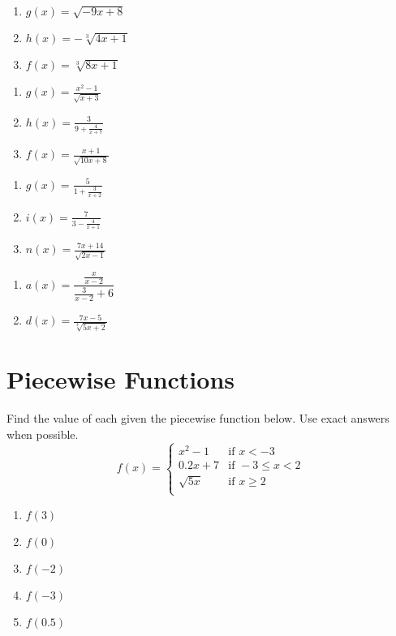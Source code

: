 \begin{multicols}{3}
\begin{enumerate}	\setcounter{enumi}{\value{Review}}
	\item $g(x) = \sqrt{-9x+8}$
	\item $h(x) = -\sqrt[3]{4x+1}$
	\item $f(x) = \sqrt[3]{8x+1}$
\end{enumerate}	\setcounter{Review}{\value{enumi}}
\end{multicols}
\begin{multicols}{3}
\begin{enumerate}	\setcounter{enumi}{\value{Review}}
	\item $g(x) = \frac{x^2-1}{\sqrt{x+3}}$
	\item $h(x) = \frac{3}{9 + \frac{4}{x+7}}$
	\item $f(x) = \frac{x+1}{\sqrt{10x+8}}$
\end{enumerate}	\setcounter{Review}{\value{enumi}}
\end{multicols}
\begin{multicols}{3}
\begin{enumerate}	\setcounter{enumi}{\value{Review}}
	\item $g(x) = \frac{5}{1+\frac{3}{x+2}}$
	\item $i(x) = \frac{7}{3-\frac{4}{x+1}}$
	\item $n(x) = \frac{7x+14}{\sqrt{2x-1}}$
\end{enumerate}	\setcounter{Review}{\value{enumi}}
\end{multicols}
\begin{multicols}{3}
\begin{enumerate}	\setcounter{enumi}{\value{Review}}
	\item $a(x) = \dfrac{\frac{x}{x-2}}{{\frac{3}{x-2}+6}}$
	\item $d(x) = \frac{7x-5}{\sqrt[3]{5x+2}}$
\end{enumerate}
\end{multicols}

\section{Piecewise Functions}

Find the value of each given the piecewise function below. Use exact answers when possible.
\[
f(x) = \begin{cases}
    x^2-1   &\text{if } x < -3 \\
    0.2x+7  &\text{if } -3 \leq x < 2   \\
    \sqrt{5x}   &\text{if } x \geq 2    \\
\end{cases}
\]
\begin{enumerate}
\item $f(3)$
\item $f(0)$
\item $f(-2)$
\item $f(-3)$
\item $f(0.5)$
\setcounter{Review}{\value{enumi}}
\end{enumerate}

